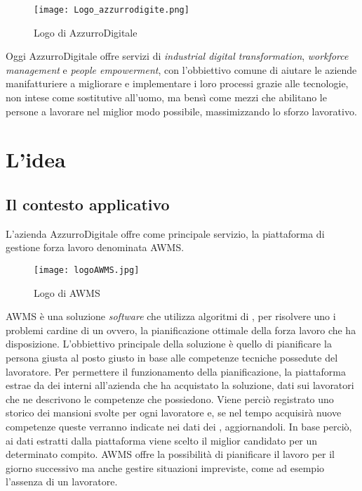 \begin{figure}[h]
	\begin{center}
		\texttt{[image: Logo\_azzurrodigite.png]}
			\caption{Logo di AzzurroDigitale}
	\end{center}
\end{figure}
\pagebreak

Oggi AzzurroDigitale offre servizi di \emph{industrial digital transformation}, \emph{workforce management} e \emph{people empowerment}, con l'obbiettivo comune di aiutare le aziende manifatturiere a migliorare e implementare i loro processi grazie alle tecnologie, non intese come sostitutive all’uomo, ma bensì come mezzi che abilitano le persone a lavorare nel miglior modo possibile, massimizzando lo sforzo lavorativo.\\

\section{L'idea}

\subsection{Il contesto applicativo}
L'azienda AzzurroDigitale offre come principale servizio, la piattaforma di gestione forza lavoro denominata \gls{AWMS}.\\
	\begin{figure}[!h] 
		\begin{center}
			\texttt{[image: logoAWMS.jpg]}
			\caption{Logo di AWMS}
		\end{center}
	\end{figure}

\gls{AWMS} è una soluzione \emph{software} che utilizza algoritmi di , per risolvere uno i problemi cardine di un  ovvero, la pianificazione ottimale della forza lavoro che ha disposizione. L'obbiettivo principale della soluzione è quello di pianificare la persona giusta al posto giusto in base alle competenze tecniche possedute del lavoratore. Per permettere il funzionamento della pianificazione, la piattaforma estrae da dei  interni all'azienda che ha acquistato la soluzione, dati sui lavoratori che ne descrivono le competenze che possiedono. Viene perciò registrato uno storico dei mansioni svolte per ogni lavoratore e, se nel tempo acquisirà nuove competenze queste verranno indicate nei dati dei , aggiornandoli. In base perciò, ai dati estratti dalla piattaforma viene scelto il miglior candidato per un determinato compito. \gls{AWMS} offre la possibilità di pianificare il lavoro per il giorno successivo ma anche gestire situazioni impreviste, come ad esempio l'assenza di un lavoratore.

